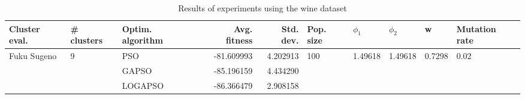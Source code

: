 \begin{table}
\centering
\caption{Results of experiments using the wine dataset}
\begin{tabular}{lllrrlllll}
\toprule
               Cluster eval. &        \# clusters & Optim. algorithm &  Avg. fitness &  Std. dev. &            Pop. size &               $\phi_{1}$ &               $\phi_{2}$ &                       w &         Mutation rate \\
\midrule
\multirow{3}{*}{Fuku Sugeno} & \multirow{3}{*}{9} &              PSO &    -81.609993 &   4.202913 & \multirow{3}{*}{100} & \multirow{3}{*}{1.49618} & \multirow{3}{*}{1.49618} & \multirow{3}{*}{0.7298} & \multirow{3}{*}{0.02} \\
                             &                    &            GAPSO &    -85.196159 &   4.434290 &                      &                          &                          &                         &                       \\
                             &                    &          LOGAPSO &    -86.366479 &   2.908158 &                      &                          &                          &                         &                       \\
\bottomrule
\end{tabular}
\end{table}
